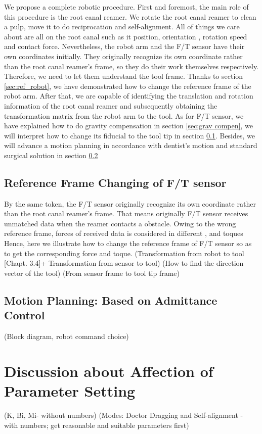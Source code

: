 We propose a complete robotic procedure. First and foremost, the main role of this procedure is the root canal reamer. We rotate the root canal reamer to clean a pulp, move it to do reciprocation and self-alignment. All of things we care about are all on the root canal such as it position, orientation , rotation speed and contact force. Nevertheless, the robot arm and the F/T sensor have their own coordinates initially. They originally recognize its own coordinate rather than the root canal reamer's frame, so they do their work themselves respectively. Therefore, we need to let them understand the tool frame. Thanks to section \ref{sec:ref_robot}, we have demonstrated how to change the reference frame of the robot arm. After that, we are capable of identifying the translation and rotation information of the root canal reamer and subsequently obtaining the transformation matrix from the robot arm to the tool. As for F/T sensor, we have explained how to do gravity compensation in section \ref{sec:grav compen}, we will interpret how to change its fiducial to the tool tip in section \ref{sec:rfc}. Besides, we will advance a motion planning in accordance with dentist's motion and standard surgical solution in section \ref{sec:motion planning} 
\subsection{Reference Frame Changing of F/T sensor}
\label{sec:rfc}
By the same token, the F/T sensor originally recognize its own coordinate rather than the root canal reamer's frame. That means originally F/T sensor receives unmatched data when the reamer contacts a obstacle. Owing to the wrong reference frame, forces of received data is considered in different , and toques  Hence, here we illustrate how to change the reference frame of F/T sensor so as to get the corresponding force and toque.
(Transformation from robot to tool [Chapt. 3.4]+ Transformation from sensor to tool) 
(How to find the direction vector of the tool)
(From sensor frame to tool tip frame)
\subsection{Motion Planning: Based on Admittance Control}
\label{sec:motion planning} 
(Block diagram, robot command choice)
\section{Discussion about Affection of Parameter Setting}
\label{sec:affection}
(K, Bi, Mi- without numbers)
(Modes: Doctor Dragging and Self-alignment - with numbers; get reasonable and suitable parameters first)